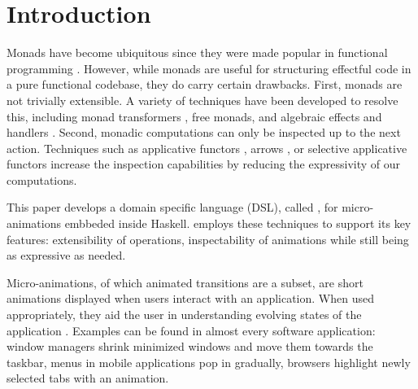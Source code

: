 \section{Introduction}
\label{sec:intro}

Monads have become ubiquitous since they were made popular in functional programming \cite{DBLP:conf/lfp/Wadler90}. However, while monads are useful for structuring effectful code in a pure functional codebase, they do carry certain drawbacks. First, monads are not trivially extensible. A variety of techniques have been developed to resolve this, including monad transformers \cite{DBLP:conf/popl/LiangHJ95}, free monads, and algebraic effects and handlers \cite{DBLP:conf/esop/PlotkinP09}. Second, monadic computations can only be inspected up to the next action. Techniques such as applicative functors \cite{DBLP:journals/jfp/McbrideP08}, arrows \cite{DBLP:journals/scp/Hughes00}, or selective applicative functors increase the inspection capabilities by reducing the expressivity of our computations.

This paper develops a domain specific language (DSL), called \dsl{}, for micro-animations embbeded inside Haskell. \dsl{} employs these techniques to support its key features: extensibility of operations, inspectability of animations while still being as expressive as needed.

Micro-animations, of which animated transitions are a subset, are short animations displayed when users interact with an application. When used appropriately, they aid the user in understanding evolving states of the application \cite{DBLP:conf/infovis/BedersonB99} \cite{DBLP:conf/chi/Gonzalez96} \cite{DBLP:journals/tvcg/HeerR07}. Examples can be found in almost every software application: window managers shrink minimized windows and move them towards the taskbar, menus in mobile applications pop in gradually, browsers highlight newly selected tabs with an animation.

